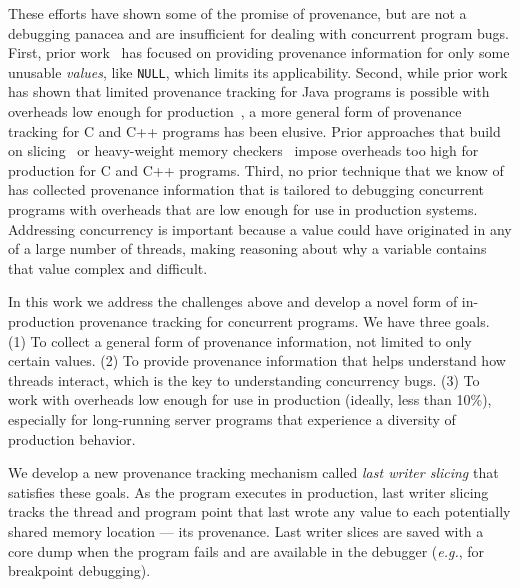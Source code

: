 \documentclass[preprint,9pt]{sigplanconf}
\begin{document}
These efforts have shown some of the promise of provenance, but are not a
debugging panacea and are insufficient for dealing with concurrent program
bugs. First, prior work~\cite{badapples} has focused on providing provenance
information for only some unusable {\em values}, like {\tt NULL}, which limits its applicability. 
Second, while prior work has shown that limited provenance tracking for Java
programs is possible with overheads low enough for production~\cite{badapples},
a more general form of provenance tracking for C and C++ programs has been
elusive. Prior approaches that build on slicing~\cite{thinslicing,
tipslicingsurvey, whylineicse} or heavy-weight memory checkers~\cite{badapples}
impose overheads too high for production for C and C++ programs. Third, no
prior technique that we know of has collected provenance information that is
tailored to debugging concurrent programs with overheads that are low enough
for use in production systems. Addressing concurrency is important because a
value could have originated in any of a large number of threads, making
reasoning about why a variable contains that value complex and difficult. 


In this work we address the challenges above and develop a novel form of
in-production provenance tracking for concurrent programs. We have three goals.
(1) To collect a general form of provenance information, not limited to only
certain values. (2) To provide provenance information that helps understand how
threads interact, which is the key to understanding concurrency bugs. (3) To
work with overheads low enough for use in production (ideally, less than 10\%),
especially for long-running server programs that experience a diversity of production behavior.

We develop a new provenance tracking mechanism called {\em last writer
slicing} that satisfies these goals.   As the program executes in production,
last writer slicing tracks the thread and program point that last wrote any
value to each potentially shared memory location --- its provenance.  Last
writer slices are saved with a core dump when the program fails and are
available in the debugger ({\em e.g.}, for breakpoint debugging).
\end{document}
